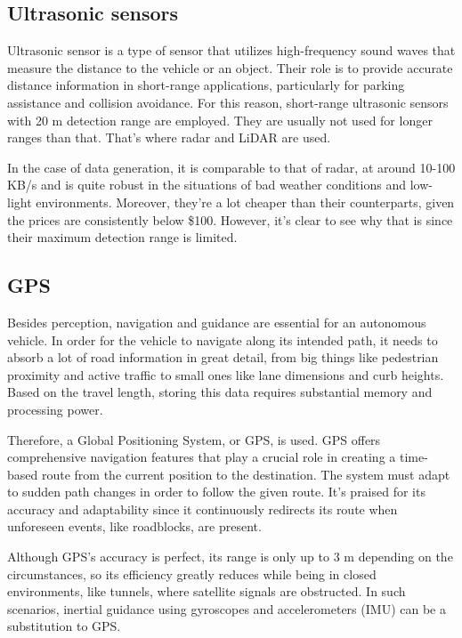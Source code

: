 \documentclass[10pt,oneside,english,a4paper]{article}
\begin{document}
\subsection{Ultrasonic sensors}
\indent Ultrasonic sensor is a type of sensor that utilizes high-frequency sound waves that measure the distance to the vehicle or an object. Their role is to provide accurate distance information in short-range applications, particularly for parking assistance and collision avoidance. For this reason, short-range ultrasonic sensors with 20 m detection range are employed. They are usually not used for longer ranges than that. That's where radar and LiDAR are used. 
\par In the case of data generation, it is comparable to that of radar, at around 10-100 KB/s and is quite robust in the situations of bad weather conditions and low-light environments. Moreover, they're a lot cheaper than their counterparts, given the prices are consistently below \$100. However, it's clear to see why that is since their maximum detection range is limited.
\cite{stateoftheart}\cite{Sensorfusion}

\subsection{GPS}
\indent Besides perception, navigation and guidance are essential for an autonomous vehicle. In order for the vehicle to navigate along its intended path, it needs to absorb a lot of road information in great detail, from big things like pedestrian proximity and active traffic to small ones like lane dimensions and curb heights. Based on the travel length, storing this data requires substantial memory and processing power.
\par Therefore, a Global Positioning System, or GPS, is used. GPS offers comprehensive navigation features that play a crucial role in creating a time-based route from the current position to the destination. The system must adapt to sudden path changes in order to follow the given route. It's praised for its accuracy and adaptability since it continuously redirects its route when unforeseen events, like roadblocks, are present. 
\par Although GPS's accuracy is perfect, its range is only up to 3 m depending on the circumstances, so its efficiency greatly reduces while being in closed environments, like tunnels, where satellite signals are obstructed. In such scenarios, inertial guidance using gyroscopes and accelerometers (IMU) can be a substitution to GPS.
\cite{researchresults}\cite{Sensorfusion}\cite{stateoftheart}
\end{document}
